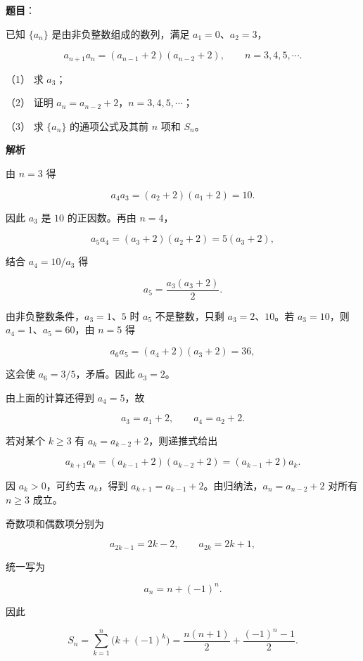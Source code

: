 \begin{answer}

\textbf{题目}：

已知 $\{a_n\}$ 是由非负整数组成的数列，满足 $a_1=0\text{、}a_2=3$，

\nopagebreak[4]
\[
a_{n+1}a_n=(a_{n-1}+2)(a_{n-2}+2),\qquad n=3,4,5,\cdots.
\]

（1） 求 $a_3$；

（2） 证明 $a_n=a_{n-2}+2$，$n=3,4,5,\cdots$；

（3） 求 $\{a_n\}$ 的通项公式及其前 $n$ 项和 $S_n$。

\textbf{解析}


由 $n=3$ 得

\nopagebreak[4]
\[
a_4a_3=(a_2+2)(a_1+2)=10.
\]

因此 $a_3$ 是 $10$ 的正因数。再由 $n=4$，

\nopagebreak[4]
\[
a_5a_4=(a_3+2)(a_2+2)=5(a_3+2),
\]

结合 $a_4=10/a_3$ 得

\nopagebreak[4]
\[
a_5=\frac{a_3(a_3+2)}2.
\]

由非负整数条件，$a_3=1\text{、}5$ 时 $a_5$ 不是整数，只剩 $a_3=2\text{、}10$。若 $a_3=10$，则 $a_4=1\text{、}a_5=60$，由 $n=5$ 得

\nopagebreak[4]
\[
a_6a_5=(a_4+2)(a_3+2)=36,
\]

这会使 $a_6=3/5$，矛盾。因此 $a_3=2$。


由上面的计算还得到 $a_4=5$，故

\nopagebreak[4]
\[
a_3=a_1+2,\qquad a_4=a_2+2.
\]

若对某个 $k\geqslant3$ 有 $a_k=a_{k-2}+2$，则递推式给出

\nopagebreak[4]
\[
a_{k+1}a_k=(a_{k-1}+2)(a_{k-2}+2)
=(a_{k-1}+2)a_k.
\]

因 $a_k>0$，可约去 $a_k$，得到 $a_{k+1}=a_{k-1}+2$。由归纳法，$a_n=a_{n-2}+2$ 对所有 $n\geqslant3$ 成立。


奇数项和偶数项分别为

\nopagebreak[4]
\[
a_{2k-1}=2k-2,\qquad a_{2k}=2k+1,
\]

统一写为

\nopagebreak[4]
\[
a_n=n+(-1)^n.
\]

因此

\nopagebreak[4]
\[
S_n=\sum_{k=1}^n\bigl(k+(-1)^k\bigr)
=\frac{n(n+1)}2+\frac{(-1)^n-1}{2}.
\]




\end{answer}